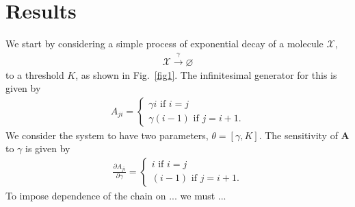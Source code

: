 \documentclass[aps,prl,preprint,groupedaddress]{revtex4-1}
\newcommand{\Av}{\mathbf{A}}
\begin{document}
\section{Results}
We start by considering a simple process of exponential decay of a molecule $\mathcal{X}$,
\begin{align}
  \mathcal{X}\xrightarrow{\gamma} \varnothing
\end{align}
to a threshold $K$, as shown in Fig.\ \ref{fig1}. The infinitesimal generator for this is given by
\begin{align}
  A_{ji} = \begin{cases}
            \gamma i  \text{ if } i=j \\
            \gamma (i-1) \text{ if } j = i+1.
          \end{cases}
\end{align}
We consider the system to have two parameters, $\theta=[\gamma,K]$. The sensitivity of $\Av$ to $\gamma$ is given by
\begin{align}
  \frac{\partial A_{ji}}{\partial \gamma} = \begin{cases}
             i  \text{ if } i=j \\
            (i-1) \text{ if } j = i+1.
          \end{cases}
\end{align}
To impose dependence of the chain on ... we must ...
\end{document}
